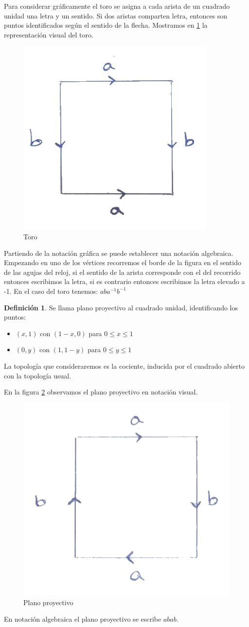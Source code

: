 \documentclass[a4paper,11pt,spanish, twoside, leqno]{tfg-uam}
\theoremstyle{definition}
\newtheorem{defin}[teor]{Definici\'on}
\begin{document}
Para considerar gráficamente el toro se asigna a cada arista de un cuadrado unidad una letra y un sentido. Si dos aristas comparten letra, entonces son puntos identificados según el sentido de la flecha. Mostramos en \ref{fig:toro} la representación visual del toro.

\begin{figure}[h]\label{fig:toro}
	\centering
	\includegraphics[width=0.3\linewidth]{imagenes/toro.png}
	\caption{Toro}
\end{figure} 

Partiendo de la notación gráfica se puede establecer una notación algebraica. Empezando en uno de los vértices recorremos el borde de la figura en el sentido de las agujas del reloj, si el sentido  de la arista corresponde con el del recorrido entonces escribimos la letra, si es contrario entonces escribimos la letra elevado a -1. En el caso del toro tenemos: $aba^{-1}b^{-1}$ 



\begin{defin}\label{defin:planoproyectivo}
	Se llama plano proyectivo al cuadrado unidad, identificando los puntos:
	\begin{itemize}
		\item 
		$(x,1)$ con $(1-x,0)$ para $0\leq x\leq 1$
		\item 
		$(0,y)$ con $(1,1-y)$ para $0\leq y\leq 1$
	\end{itemize}
	La topología que consideraremos es la cociente, inducida por el cuadrado abierto con la topología usual.
\end{defin}

En la figura \ref{fig:planoproyectivo} observamos el plano proyectivo en notación visual.

\begin{figure}[h]\label{fig:planoproyectivo}
	\centering
	\includegraphics[width=0.3\linewidth]{imagenes/planop.png}
	\caption{Plano proyectivo}
\end{figure} 
En notación algebraica el plano proyectivo se escribe $abab$.
\end{document}
